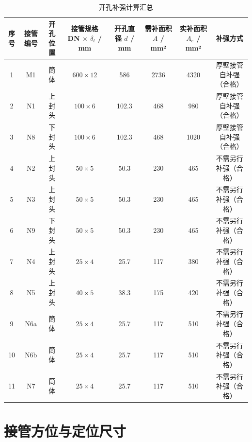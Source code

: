 \begin{table}[htbp]
  \centering
  \caption{开孔补强计算汇总}
  \label{tab:cad-reinforcement-detail}
  \small\renewcommand{\arraystretch}{1.2}
  \setlength{\tabcolsep}{3pt}
  \begin{tabularx}{\textwidth}{@{}c c c c c c c c@{}}
    \toprule
    \textbf{序号} & \textbf{接管编号} & \textbf{开孔位置} & \textbf{接管规格 DN $\times$ $\delta_t$ / mm} & \textbf{开孔直径 $d$ / mm} & \textbf{需补面积 $A$ / mm²} & \textbf{实补面积 $A_e$ / mm²} & \textbf{补强方式} \\
    \midrule
    1  & M1    & 筒体   & $600 \times 12$   & 586   & 2736  & 4320  & 厚壁接管自补强（合格） \\
    2  & N1    & 上封头 & $100 \times 6$    & 102.3 & 468   & 980   & 厚壁接管自补强（合格） \\
    3  & N8    & 下封头 & $100 \times 6$    & 102.3 & 468   & 1020  & 厚壁接管自补强（合格） \\
    4  & N2    & 上封头 & $50 \times 5$     & 50.3  & 230   & 465   & 不需另行补强（合格） \\
    5  & N3    & 上封头 & $50 \times 5$     & 50.3  & 230   & 465   & 不需另行补强（合格） \\
    6  & N9    & 下封头 & $50 \times 5$     & 50.3  & 230   & 465   & 不需另行补强（合格） \\
    7  & N4    & 上封头 & $25 \times 4$     & 25.7  & 117   & 380   & 不需另行补强（合格） \\
    8  & N5    & 上封头 & $40 \times 5$     & 38.3  & 175   & 420   & 不需另行补强（合格） \\
    9  & N6a   & 筒体   & $25 \times 4$     & 25.7  & 117   & 510   & 不需另行补强（合格） \\
    10 & N6b   & 筒体   & $25 \times 4$     & 25.7  & 117   & 510   & 不需另行补强（合格） \\
    11 & N7    & 筒体   & $25 \times 4$     & 25.7  & 117   & 510   & 不需另行补强（合格） \\
    \bottomrule
  \end{tabularx}
\end{table}

\section{接管方位与定位尺寸}
\label{sec:cad-orientation}

